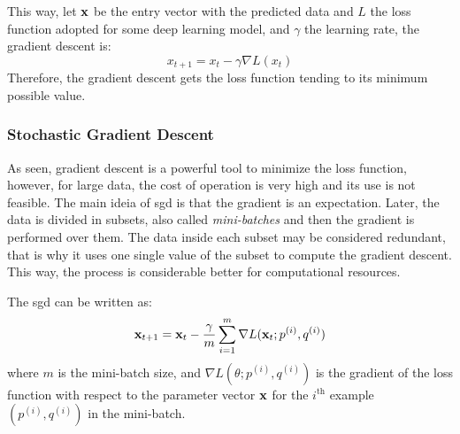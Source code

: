 This way, let \(\vb{x}\) be the entry vector with the predicted data and \(L\) the loss function adopted for some deep learning model, and \(\gamma\) the learning rate, the gradient descent is:
%
\begin{equation}
    x_{t+1} = x_t - \gamma\nabla L(x_t)
\end{equation}
%
Therefore, the gradient descent gets the loss function tending to its minimum possible value.

\subsubsection*{Stochastic Gradient Descent}

As seen, gradient descent is a powerful tool to minimize the loss function, however, for large data, the cost of operation is very high and its use is not feasible. 
The main ideia of \gls*{sgd} is that the gradient is an expectation.
Later, the data is divided in subsets, also called \emph{mini-batches} and then the gradient is performed over them.
The data inside each subset may be considered redundant, that is why it uses one single value of the subset to compute the gradient descent.
This way, the process is considerable better for computational resources.

The \gls*{sgd} can be written as:
%
\begin{equation}
    \vb{x}_{t+1} = \vb{x}_t - \frac{\gamma}{m} \sum_{i=1}^m \nabla L(\vb{x}_t; p^{(i)},q^{(i)})
\end{equation}
%
where \(m\) is the mini-batch size, and \(\nabla L(\theta; p^{(i)}, q^{(i)})\) is the gradient of the loss function with respect to the parameter vector \(\vb{x}\) for the \(i^{\text{th}}\) example \((p^{(i)}, q^{(i)})\) in the mini-batch.






